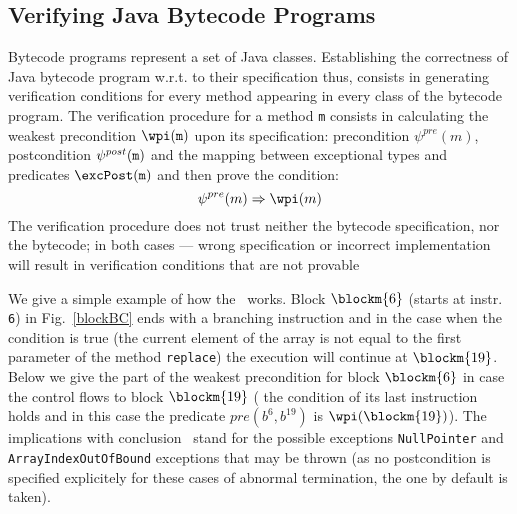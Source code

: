 \subsection{Verifying Java Bytecode Programs} Bytecode programs represent a set of Java classes. Establishing the correctness of Java bytecode program w.r.t. to their specification thus, consists in generating verification conditions for every method appearing in every class of the bytecode program.
The verification procedure for a method \texttt{m} consists in  calculating the weakest precondition $\wpi(\tt{m})$ upon its specification: precondition $\psi^{pre}(m)$, 
postcondition $\psi^{post}(\tt{m})$ and the mapping between exceptional types and predicates $\excPost(\tt{m})$ and then prove the condition: 
$$
\psi^{pre}(m)  \Rightarrow \wpi(m)
$$    
The verification procedure does not trust neither the bytecode specification, nor the bytecode; in both cases --- wrong 
specification or incorrect implementation will result in verification conditions that are not provable 

 We give a simple example of how the \wpi \ works. Block $\blockm{6}$ (starts at instr. \texttt{6}) in Fig.~\ref{blockBC} ends with a branching instruction and in the case when the condition is true (the current element of the array is not equal to the first parameter of the method \texttt{replace}) the execution will continue at $\blockm{19}$. Below we give the part of the weakest precondition for block $\blockm{6}$ in case the control flows to block $\blockm{19}$
( the condition of its last instruction holds and in this case 
the predicate $pre(b^{6}, b^{19})$ is $\wpi(\blockm{19})$).  The implications with conclusion \Myfalse \ stand for the possible exceptions \texttt{NullPointer} and \texttt{ArrayIndexOutOfBound} exceptions that may be thrown (as no postcondition is specified explicitely for these cases of abnormal termination, the one by default is taken). 





